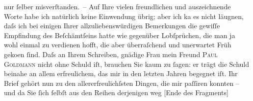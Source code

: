 \begin{ledgroupsized}[t]{13cm}
               nur ſelber misverſtanden. – Auf Ihre vielen freundlichen und auszeich{\pb}nende Worte habe ich natürlich keine Einwendung übrig; aber ich ka{\geminationn} es nicht läugnen, daſs ich bei einigen Ihrer
               allzuliebenswürdigen Bemerkungen die gewiſſe Empfindung des Beſchämtſeins hatte wie
               gegenüber Lobſprüchen, die man ja wohl einmal zu verdienen hofft, die aber
               überraſchend und unerwartet Früh geko{\geminationm}en ſind.\pend
           \pstart
           {\pb}Daſs an Ihrem Schreiben, gnädige Frau mein Freund \textsc{Paul Goldmann} nicht ohne Schuld iſt, brauchen Sie kaum zu ſagen: er trägt die Schuld beinahe
               an allem erfreulichem, das mir in den letzten Jahren begegnet iſt. Ihr Brief gehört
               nun zu den allererfreulichſsten Dingen, die mir paſſiren konnten – und da Sie ſich
               ſelbſt aus den Reihen derjenigen weg {[}Ende des Fragments{]}\pend
           \endnumbering{}\end{ledgroupsized}  \newcommand{\dateiname}{L00337}\newcommand{\titel}{Arthur Schnitzler an Lou Andreas-Salomé, 13. 6. 1894}\newcommand{\editorInnen}{Martin Anton Müller und Gerd-Hermann Susen}
      